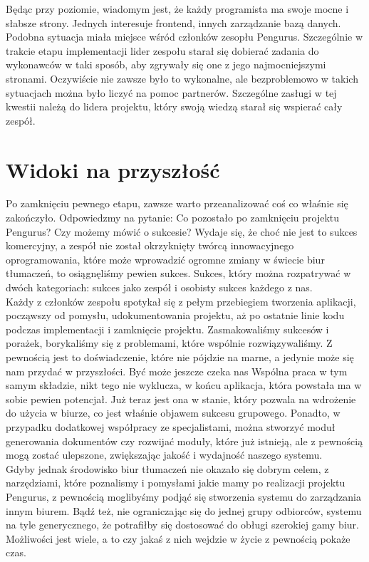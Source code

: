 \documentclass[licencjacka]{pracamgr}
\begin{document}
Będąc przy poziomie, wiadomym jest, że każdy programista ma swoje mocne i słabsze strony. Jednych interesuje frontend, innych zarządzanie bazą danych. 
Podobna sytuacja miała miejsce wśród członków zesopłu Pengurus. Szczególnie w trakcie etapu implementacji lider zespołu starał się dobierać zadania do 
wykonawców w taki sposób, aby zgrywały się one z jego najmocniejszymi stronami. Oczywiście nie zawsze było to wykonalne, 
ale bezproblemowo w takich sytuacjach można było liczyć na pomoc partnerów. Szczególne zasługi w tej kwestii należą do lidera projektu, który swoją wiedzą 
starał się wspierać cały zespół.

\section{Widoki na przyszłość}
Po zamknięciu pewnego etapu, zawsze warto przeanalizować coś co właśnie się zakończyło. Odpowiedzmy na pytanie: Co pozostało po zamknięciu projektu Pengurus?
Czy możemy mówić o sukcesie? Wydaje się, że choć nie jest to sukces komercyjny, a zespół nie został okrzyknięty twórcą innowacyjnego oprogramowania, 
które może wprowadzić ogromne zmiany w świecie biur tłumaczeń, to osiągnęliśmy pewien sukces. Sukces, który można rozpatrywać 
w dwóch kategoriach: sukces jako zespół i osobisty sukces każdego z nas. \\

Każdy z członków zespołu spotykał się z pełym przebiegiem tworzenia aplikacji, począwszy od pomysłu, udokumentowania projektu, aż po ostatnie linie kodu 
podczas implementacji i zamknięcie projektu. Zasmakowaliśmy sukcesów i porażek, borykaliśmy się z problemami, które wspólnie rozwiązywaliśmy. Z pewnością 
jest to doświadczenie, które nie pójdzie na marne, a jedynie może się nam przydać w przyszłości. Być może jeszcze czeka nas Wspólna praca w tym samym składzie,
nikt tego nie wyklucza, w końcu aplikacja, która powstała ma w sobie pewien potencjał. Już teraz jest ona w stanie, 
który pozwala na wdrożenie do użycia w biurze, co jest właśnie objawem sukcesu grupowego. Ponadto, w przypadku dodatkowej współpracy ze specjalistami, 
można stworzyć moduł generowania dokumentów czy rozwijać moduły, które już istnieją, ale z pewnością mogą zostać ulepszone, 
zwiększając jakość i wydajność naszego systemu. \\

Gdyby jednak środowisko biur tłumaczeń nie okazało się dobrym celem, z narzędziami, które poznalismy i pomysłami jakie mamy po realizacji projektu Pengurus, 
z pewnością moglibyśmy podjąć się stworzenia systemu do zarządzania innym biurem. Bądź też, nie ograniczając się do jednej grupy odbiorców, 
systemu na tyle generycznego, że potrafiłby się dostosować do obługi szerokiej gamy biur. 
Możliwości jest wiele, a to czy jakaś z nich wejdzie w życie z pewnością pokaże czas.
\end{document}
